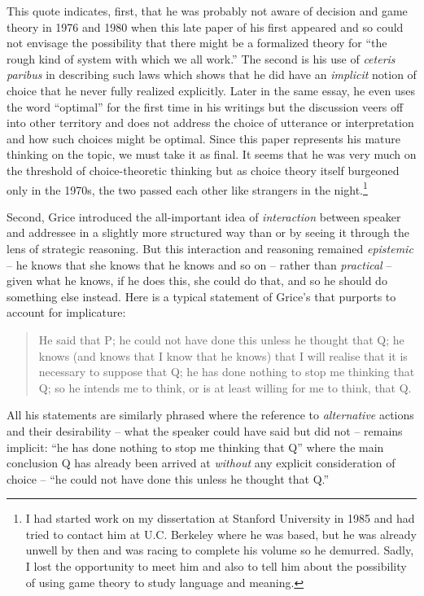 This quote indicates, first, that he was probably not aware of decision and game theory in 1976 and 1980 when this late paper of his first appeared and so could not envisage the possibility that there might be a formalized theory for ``the rough kind of system with which we all work.'' The second is his use of \emph{ceteris paribus} in describing such laws which shows that he did have an \emph{implicit} notion of choice that he never fully realized explicitly. Later in the same essay, he even uses the word ``optimal'' for the first time in his writings but the discussion veers off into other territory and does not address the choice of utterance or interpretation and how such choices might be optimal. Since this paper represents his mature thinking on the topic, we must take it as final. It seems that he was very much on the threshold of choice-theoretic thinking but as choice theory itself burgeoned only in the 1970s, the two passed each other like strangers in the night.\footnote{I had started work on my dissertation at Stanford University in 1985 and had tried to contact him at U.C. Berkeley where he was based, but he was already unwell by then and was racing to complete his volume so he demurred. Sadly, I lost the opportunity to meet him and also to tell him about the possibility of using game theory to study language and meaning.}

Second, Grice introduced the all-important idea of \emph{interaction} between speaker and addressee in a slightly more structured way than \citet{wittgenstein:pi} or \citet{austin:pp} by seeing it through the lens of strategic reasoning. But this interaction and reasoning remained  \emph{epistemic} -- he knows that she knows that he knows and so on -- rather than \emph{practical} -- given what he knows, if he does this, she could do that, and so he should do something else instead. Here is a typical statement of Grice's that purports to account for implicature:

\begin{quote}

He said that P; he could not have done this unless he thought that Q; he knows (and knows that I know that he knows) that I will realise that it is necessary to suppose that Q; he has done nothing to stop me thinking that Q; so he intends me to think, or is at least willing for me to think, that Q. \citep[30--31]{grice:landc}

\end{quote}

\noindent All his statements are similarly phrased where the reference to \emph{alternative} actions and their desirability -- what the speaker could have said but did not -- remains implicit: ``he has done nothing to stop me thinking that Q'' where the main conclusion Q has already been arrived at \emph{without} any explicit consideration of choice -- ``he could not have done this unless he thought that Q.''

